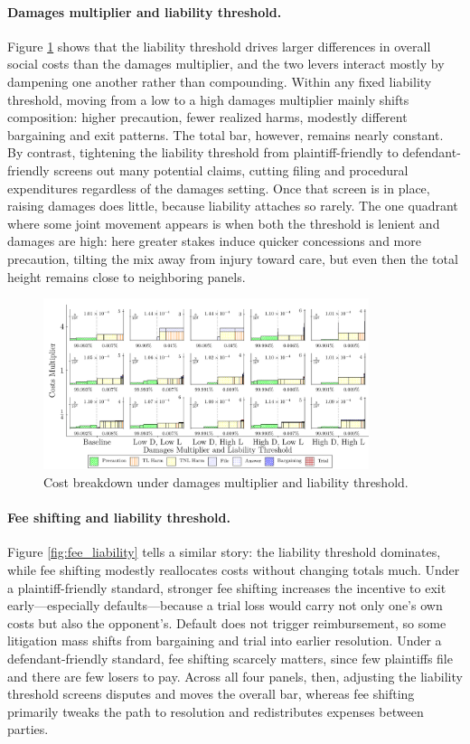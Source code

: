 \documentclass{article}
\begin{document}
\paragraph{Damages multiplier and liability threshold.}
Figure \ref{fig:dm_liability} shows that the liability threshold drives larger differences in overall social costs than the damages multiplier, and the two levers interact mostly by dampening one another rather than compounding. Within any fixed liability threshold, moving from a low to a high damages multiplier mainly shifts composition: higher precaution, fewer realized harms, modestly different bargaining and exit patterns. The total bar, however, remains nearly constant. By contrast, tightening the liability threshold from plaintiff-friendly to defendant-friendly screens out many potential claims, cutting filing and procedural expenditures regardless of the damages setting. Once that screen is in place, raising damages does little, because liability attaches so rarely. The one quadrant where some joint movement appears is when both the threshold is lenient and damages are high: here greater stakes induce quicker concessions and more precaution, tilting the mix away from injury toward care, but even then the total height remains close to neighboring panels.

\begin{figure}[ht]
  \centering
  \includegraphics[width=0.85\textwidth]{../Figures/Cost Breakdown Damages Multiplier and Liability Threshold (All Rows).pdf}
  \caption{Cost breakdown under damages multiplier and liability threshold.}
  \label{fig:dm_liability}
\end{figure}

\paragraph{Fee shifting and liability threshold.}
Figure \ref{fig:fee_liability} tells a similar story: the liability threshold dominates, while fee shifting modestly reallocates costs without changing totals much. Under a plaintiff-friendly standard, stronger fee shifting increases the incentive to exit early—especially defaults—because a trial loss would carry not only one’s own costs but also the opponent’s. Default does not trigger reimbursement, so some litigation mass shifts from bargaining and trial into earlier resolution. Under a defendant-friendly standard, fee shifting scarcely matters, since few plaintiffs file and there are few losers to pay. Across all four panels, then, adjusting the liability threshold screens disputes and moves the overall bar, whereas fee shifting primarily tweaks the path to resolution and redistributes expenses between parties.
\end{document}
